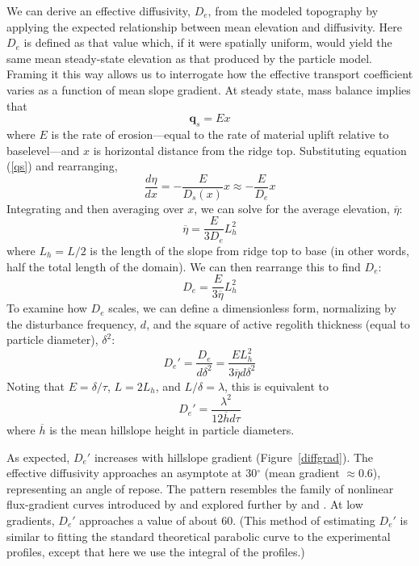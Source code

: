\documentclass[esurf, manuscript]{copernicus}
\begin{document}
We can derive an effective diffusivity, $D_e$, from the modeled topography by applying the expected relationship between mean elevation and diffusivity. Here $D_e$ is defined as that value which, if it were spatially uniform, would yield the same mean steady-state elevation as that produced by the particle model. Framing it this way allows us to interrogate how the effective transport coefficient varies as a function of mean slope gradient. At steady state, mass balance implies that
\begin{equation}
\mathbf{q}_s = E x
\end{equation}
where $E$ is the rate of erosion---equal to the rate of material uplift relative to baselevel---and $x$ is horizontal distance from the ridge top. Substituting equation (\ref{qs}) and rearranging,
\begin{equation}
\frac{d \eta}{d x} = -\frac{E}{D_s(x)} x \approx -\frac{E}{D_e} x
\end{equation}
Integrating and then averaging over $x$, we can solve for the average elevation, $\overline{\eta}$:
\begin{equation}
\overline{\eta} = \frac{E}{3 D_e} L_h^2
\end{equation}
where $L_h=L/2$ is the length of the slope from ridge top to base (in other words, half the total length of the domain). We can then rearrange this to find $D_e$:
\begin{equation}
D_e = \frac{E}{3 \overline{\eta}} L_h^2
\end{equation}
To examine how $D_e$ scales, we can define a dimensionless form, normalizing by the disturbance frequency, $d$, and the square of active regolith thickness (equal to particle diameter), $\delta^2$:
\begin{equation}
D_e' = \frac{D_e}{d\delta^2} = \frac{EL_h^2}{3\overline{\eta}d\delta^2}
\end{equation}
Noting that $E=\delta/\tau$,  $L = 2L_h$, and $L/\delta = \lambda$, this is equivalent to
\begin{equation}
D_e' = \frac{\lambda^2}{12 \overline{h}d\tau}
\end{equation}
where $\overline{h}$ is the mean hillslope height in particle diameters.

As expected, $D_e'$ increases with hillslope gradient (Figure~\ref{diffgrad}). The effective diffusivity approaches an asymptote at 30$^\circ$ (mean gradient $\approx$0.6), representing an angle of repose. The pattern resembles the family of nonlinear flux-gradient curves introduced by \citet{andrews1987fitting} and explored further by \citet{howard1994detachment} and \citet{roering1999evidence}. At low gradients, $D_e'$ approaches a value of about 60. (This method of estimating $D_e'$ is similar to fitting the standard theoretical parabolic curve to the experimental profiles, except that here we use the integral of the profiles.)
\end{document}
